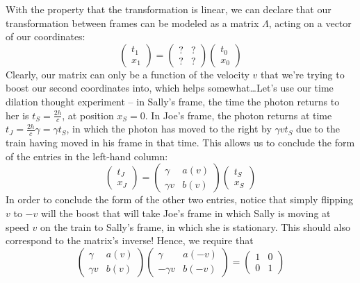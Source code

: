 \documentclass[12pt]{scrartcl}
\begin{document}
With the property that the transformation is linear, we can declare that our transformation between frames can be modeled as a matrix $\Lambda$, acting on a vector of our coordinates:
\[
	\begin{pmatrix}
		t_1 \\ x_1
	\end{pmatrix} = \begin{pmatrix}
		? & ? \\ ? & ?
	\end{pmatrix}\begin{pmatrix}
		t_0 \\ x_0
	\end{pmatrix}
\]
Clearly, our matrix can only be a function of the velocity $v$ that we're trying to boost our second coordinates into, which helps somewhat\ldots Let's use our time dilation thought experiment --  in Sally's frame, the time the photon returns to her is $t_S = \frac{2h}{c}$, at position $x_S = 0$. In Joe's frame, the photon returns at time $t_J = \frac{2h}{c}\gamma = \gamma t_S$, in which the photon has moved to the right by $\gamma v t_S$ due to the train having moved in his frame in that time. This allows us to conclude the form of the entries in the left-hand column:
\[
	\begin{pmatrix}
		t_J \\ x_J
	\end{pmatrix} = \begin{pmatrix}
		\gamma & a(v) \\ \gamma v & b(v)
	\end{pmatrix}\begin{pmatrix}
		t_S \\ x_S
	\end{pmatrix}
\]
In order to conclude the form of the other two entries, notice that simply flipping $v$ to $-v$ will the boost that will take Joe's frame in which Sally is moving at speed $v$ on the train to Sally's frame, in which she is stationary. This should also correspond to the matrix's inverse! Hence, we require that
\[
	\begin{pmatrix}
		\gamma & a(v) \\ \gamma v & b(v)
	\end{pmatrix}\begin{pmatrix}
		\gamma & a(-v) \\ -\gamma v & b(-v)
	\end{pmatrix} = \begin{pmatrix}
		1 & 0 \\ 0 & 1
	\end{pmatrix}
\]
\end{document}
